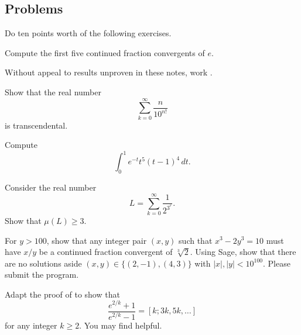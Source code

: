 \documentclass[../notes.tex]{subfiles}
\begin{document}
\subsection{Problems}
Do ten points worth of the following exercises.
\begin{prob}[1 points]
	Compute the first five continued fraction convergents of $e$.
\end{prob}
\begin{prob}[2 points]
	Without appeal to results unproven in these notes, work .
\end{prob}
\begin{prob}[3 points]
	Show that the real number
	\[\sum_{k=0}^\infty\frac n{10^{n!}}\]
	is transcendental.
\end{prob}
\begin{prob}[3 points]
	Compute
	\[\int_0^1e^{-t}t^5(t-1)^4\,dt.\]
\end{prob}
\begin{prob}[4 points]
	Consider the real number
	\[L=\sum_{k=0}^\infty\frac1{2^{3^r}}.\]
	Show that $\mu(L)\ge3$.
\end{prob}
\begin{prob}[5 points]
	For $y>100$, show that any integer pair $(x,y)$ such that $x^3-2y^3=10$ must have $x/y$ be a continued fraction convergent of $\sqrt[3]2$. Using Sage, show that there are no solutions aside $(x,y)\in\{(2,-1),(4,3)\}$ with $\left|x\right|,\left|y\right|<10^{100}$. Please submit the program.
\end{prob}
\begin{prob}[10 points]
	Adapt the proof of  to show that
	\[\frac{e^{2/k}+1}{e^{2/k}-1}=[k;3k,5k,\ldots]\]
	for any integer $k\ge2$. You may find \cite{olds-cf-e} helpful.
\end{prob}
\end{document}
